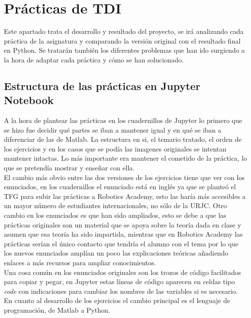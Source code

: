 \chapter{Prácticas de TDI}

Este apartado trata el desarrollo y resultado del proyecto, se irá analizando cada práctica de la asignatura y comparando la versión original con el resultado final en Python. Se tratarán también los diferentes problemas que han ido surgiendo a la hora de adaptar cada práctica y cómo se han solucionado.\\

\section{Estructura de las prácticas en Jupyter Notebook}

A la hora de plantear las prácticas en los cuadernillos de Jupyter lo primero que se hizo fue decidir qué partes se iban a mantener igual y en qué se iban a diferenciar de las de Matlab. La estructura en si, el temario tratado, el orden de los ejercicios y en los casos que se podía las imagenes originales se intentan mantener intactas. Lo más importante era mantener el cometido de la práctica, lo que se pretendía mostrar y enseñar con ella.\\

El cambio más obvio entre las dos versiones de los ejercicios tiene que ver con los enunciados, en los cuadernillos el enunciado está en inglés ya que se planteó el TFG para subir las prácticas a Robotics Academy, esto las haría más accesibles a un mayor número de estudiantes internacionales, no sólo de la URJC. Otro cambio en los enunciados es que han sido ampliados, esto se debe a que las prácticas originales son un material que se apoya sobre la teoría dada en clase y asumen que esa teoría ha sido impartida, mientras que en Robotics Academy las prácticas serían el único contacto que tendría el alumno con el tema por lo que los nuevos enunciados amplían un poco las explicaciones teóricas añadiendo enlaces a más recursos para ampliar conocimientos.\\

Una cosa común en los enunciados originales son los trozos de código facilitados para copiar y pegar, en Jupyter estas líneas de código aparecen en celdas tipo \emph{code} con indicaciones para cambiar los nombres de las variables si es necesario.\\

En cuanto al desarrollo de los ejercicios el cambio principal es el lenguaje de programación, de Matlab a Python. \\

